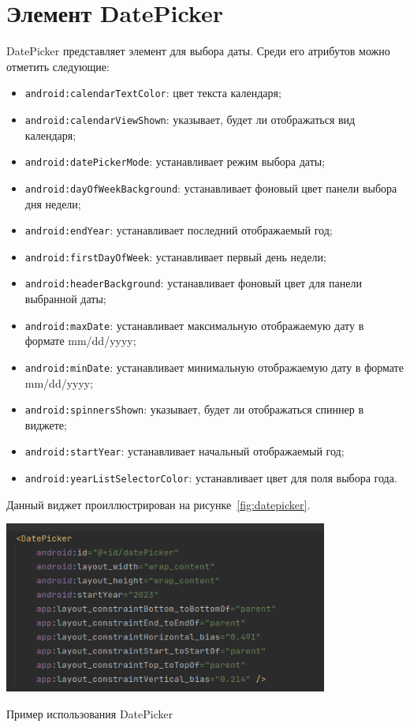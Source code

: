 \section{Элемент DatePicker}

DatePicker представляет элемент для выбора даты. Среди его атрибутов 
можно отметить следующие:
\begin{itemize}
	\item \texttt{android:calendarTextColor}: цвет текста календаря;
	\item \texttt{android:calendarViewShown}: указывает, будет ли
		отображаться вид календаря;
	\item \texttt{android:datePickerMode}: устанавливает режим выбора даты;
	\item \texttt{android:dayOfWeekBackground}: устанавливает фоновый цвет
		панели выбора дня недели;
	\item \texttt{android:endYear}: устанавливает последний отображаемый год;
	\item \texttt{android:firstDayOfWeek}: устанавливает первый день недели;
	\item \texttt{android:headerBackground}: устанавливает фоновый цвет
		для панели выбранной даты;
	\item \texttt{android:maxDate}: устанавливает максимальную отображаемую
		дату в формате mm/dd/yyyy;
	\item \texttt{android:minDate}: устанавливает минимальную отображаемую
		дату в формате mm/dd/yyyy;
	\item \texttt{android:spinnersShown}: указывает, будет ли отображаться
		спиннер в виджете;
	\item \texttt{android:startYear}: устанавливает начальный
		отображаемый год;
	\item \texttt{android:yearListSelectorColor}: устанавливает цвет для
		поля выбора года.
\end{itemize}

Данный виджет проиллюстрирован на рисунке~\ref{fig:datepicker}.

\begin{image}
	\includegraphics[width=0.8\textwidth]{Screenshot from 2023-03-25 18-07-26.png}
	\caption{Пример использования DatePicker}
	\label{fig:datepicker}
\end{image}

